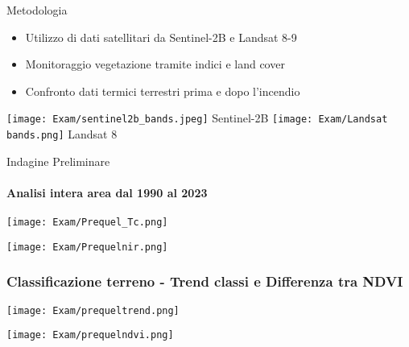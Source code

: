 \documentclass{beamer}
\begin{document}
\begin{frame}{Metodologia}
    \begin{itemize}
        \item Utilizzo di dati satellitari da Sentinel-2B e Landsat 8-9 
        \item Monitoraggio vegetazione tramite indici e land cover
        \item Confronto dati termici terrestri prima e dopo l'incendio
    \end{itemize}
    \vspace{0.5cm}
    \centering
    \texttt{[image: Exam/sentinel2b\_bands.jpeg]}
    {\tiny Sentinel-2B}
    \vspace{0.2cm}
    \texttt{[image: Exam/Landsat bands.png]}
    {\tiny Landsat 8}
\end{frame}

\begin{frame}[fragile]{Indagine Preliminare}
 \framesubtitle{Analisi intera area dal 1990 al 2023}
 \begin{center} 
            \texttt{[image: Exam/Prequel\_Tc.png]}
       \end{center}
            \vspace{0.1cm}
             \begin{center} 
                \texttt{[image: Exam/Prequelnir.png]}
\end{center}
     \end{frame}
     
\begin{frame}[fragile]
    \frametitle{\scriptsize Classificazione terreno - Trend classi e Differenza tra NDVI}
 \begin{center} 
            \texttt{[image: Exam/prequeltrend.png]}
            \end{center}
             \begin{center} 

             \vspace{0.5cm}
                \texttt{[image: Exam/prequelndvi.png]}
\end{center}
     \end{frame}
\end{document}
